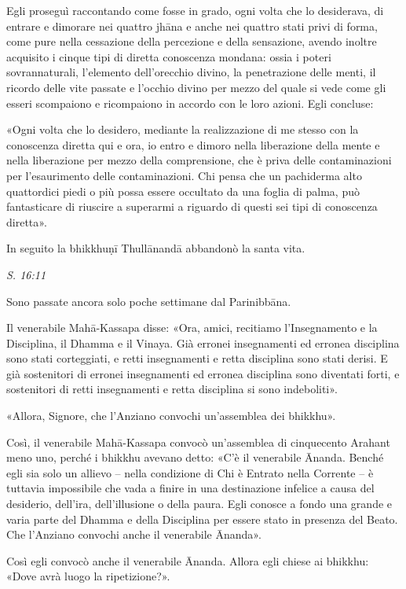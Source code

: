  Egli proseguì raccontando come fosse in grado, ogni
volta che lo desiderava, di entrare e dimorare nei quattro jhāna e anche
nei quattro stati privi di forma, come pure nella cessazione della
percezione e della sensazione, avendo inoltre acquisito i cinque tipi di
diretta conoscenza mondana: ossia i poteri sovrannaturali, l’elemento
dell’orecchio divino, la penetrazione delle menti, il ricordo delle vite
passate e l’occhio divino per mezzo del quale si vede come gli esseri
scompaiono e ricompaiono in accordo con le loro azioni. Egli concluse:


 «Ogni volta che lo desidero, mediante la realizzazione di me
stesso con la conoscenza diretta qui e ora, io entro e dimoro nella
liberazione della mente e nella liberazione per mezzo della
comprensione, che è priva delle contaminazioni per l’esaurimento delle
contaminazioni. Chi pensa che un pachiderma alto quattordici piedi o più
possa essere occultato da una foglia di palma, può fantasticare di
riuscire a superarmi a riguardo di questi sei tipi di conoscenza
diretta».


In seguito la bhikkhuṇī Thullānandā abbandonò la santa vita.


\emph{S. 16:11}


 Sono passate ancora solo poche settimane dal
Parinibbāna.


 Il venerabile Mahā-Kassapa disse: «Ora, amici, recitiamo
l’Insegnamento e la Disciplina, il Dhamma e il Vinaya. Già erronei
insegnamenti ed erronea disciplina sono stati corteggiati, e retti
insegnamenti e retta disciplina sono stati derisi. E già sostenitori di
erronei insegnamenti ed erronea disciplina sono diventati forti, e
sostenitori di retti insegnamenti e retta disciplina si sono
indeboliti».


«Allora, Signore, che l’Anziano convochi un’assemblea dei bhikkhu».


Così, il venerabile Mahā-Kassapa convocò un’assemblea di cinquecento
Arahant meno uno, perché i bhikkhu avevano detto: «C’è il venerabile
Ānanda. Benché egli sia solo un allievo – nella condizione di Chi è
Entrato nella Corrente – è tuttavia impossibile che vada a finire in una
destinazione infelice a causa del desiderio, dell’ira, dell’illusione o
della paura. Egli conosce a fondo una grande e varia parte del Dhamma e
della Disciplina per essere stato in presenza del Beato. Che l’Anziano
convochi anche il venerabile Ānanda».


Così egli convocò anche il venerabile Ānanda. Allora egli chiese ai
bhikkhu: «Dove avrà luogo la ripetizione?».


